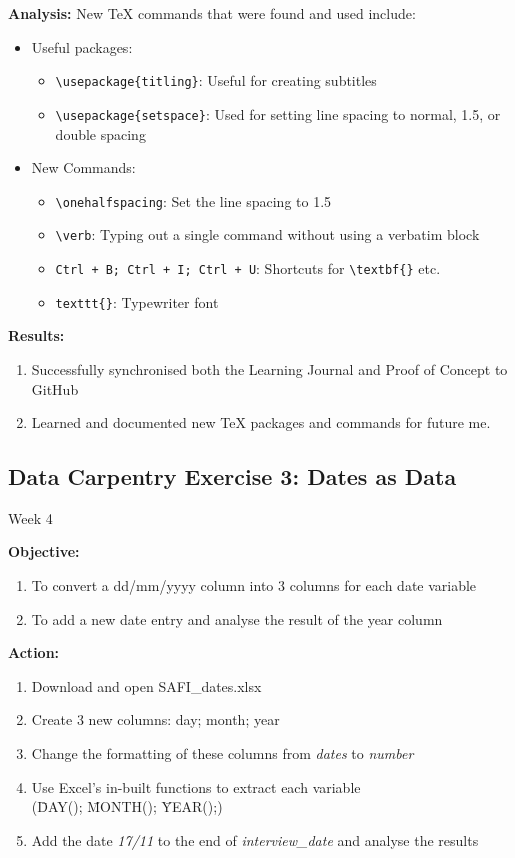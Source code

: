 \documentclass{article}
\begin{document}
\textbf{Analysis:} New TeX commands that were found and used include:
    \begin{itemize}
        \item Useful packages:
        \begin{itemize}
            \item \verb|\usepackage{titling}|: Useful for creating subtitles
            \item \verb|\usepackage{setspace}|: Used for setting line spacing to normal, 1.5, or double spacing
        \end{itemize}
        \item New Commands:
        \begin{itemize}
            \item \verb|\onehalfspacing|: Set the line spacing to 1.5
            \item \verb|\verb|: Typing out a single command without using a verbatim block
            \item \texttt{Ctrl + B; Ctrl + I; Ctrl + U}: Shortcuts for \verb|\textbf{}| etc.
            \item \verb|texttt{}|: Typewriter font
        \end{itemize}
    \end{itemize}
\textbf{Results:}
\begin{enumerate}
    \item Successfully synchronised both the Learning Journal and Proof of Concept to GitHub
    \item Learned and documented new TeX packages and commands for future me.
\end{enumerate}
\newpage
\begin{center}
\section*{Data Carpentry Exercise 3: Dates as Data}
Week 4
\end{center}
\textbf{Objective:}
\begin{enumerate}
    \item To convert a dd/mm/yyyy column into 3 columns for each date variable
    \item To add a new date entry and analyse the result of the year column
\end{enumerate}
\textbf{Action:}
\begin{enumerate}
    \item Download and open SAFI\_dates.xlsx
    \item Create 3 new columns: day; month; year
    \item Change the formatting of these columns from \textit{dates} to \textit{number}
    \item Use Excel's in-built functions to extract each variable\\ (\=DAY(); \=MONTH(); \=YEAR();)
    \item Add the date \textit{17/11} to the end of \textit{interview\_date} and analyse the results
\end{enumerate}
\end{document}
